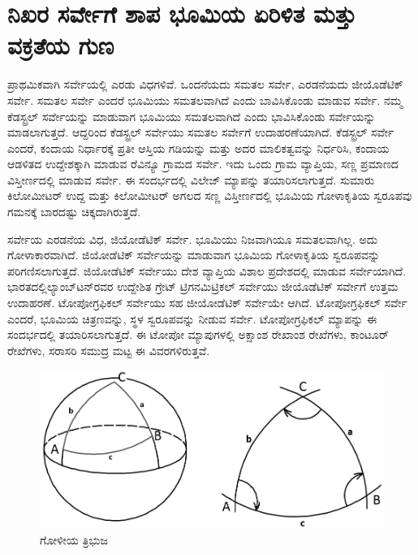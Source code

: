 
\chapter{ನಿಖರ ಸರ್ವೇಗೆ ಶಾಪ ಭೂಮಿಯ ಏರಿಳಿತ ಮತ್ತು ವಕ್ರತೆಯ ಗುಣ}

ಪ್ರಾಥಮಿಕವಾಗಿ ಸರ್ವೇಯಲ್ಲಿ ಎರಡು ವಿಧಗಳಿವೆ. ಒಂದನೆಯದು ಸಮತಲ ಸರ್ವೇ, ಎರಡನೆಯದು ಜೀಯೊಡೆಟಿಕ್​ ಸರ್ವೇ. ಸಮತಲ ಸರ್ವೇ ಎಂದರೆ ಭೂಮಿಯು ಸಮತಲವಾಗಿದೆ ಎಂದು ಬಾವಿಸಿಕೊಂಡು ಮಾಡುವ ಸರ್ವೇ. ನಮ್ಮ ಕೆಡಸ್ಟ್ರಲ್​ ಸರ್ವೇಯನ್ನು ಮಾಡುವಾಗ ಭೂಮಿಯು ಸಮತಲವಾಗಿದೆ ಎಂದು ಭಾವಿಸಿಕೊಂಡು ಸರ್ವೇಯನ್ನು ಮಾಡಲಾಗುತ್ತದೆ. ಆದ್ದರಿಂದ ಕೆಡಸ್ಟ್ರಲ್​ ಸರ್ವೇಯು ಸಮತಲ ಸರ್ವೇಗೆ ಉದಾಹರಣೆಯಾಗಿದೆ. ಕೆಡಸ್ಟ್ರಲ್​ ಸರ್ವೇ ಎಂದರೆ, ಕಂದಾಯ ನಿರ್ಧಾರಕ್ಕೆ ಪ್ರತೀ ಆಸ್ತಿಯ ಗಡಿಯನ್ನು ಮತ್ತು ಅದರ ಮಾಲಿಕತ್ವವನ್ನು ನಿರ್ಧರಿಸಿ, ಕಂದಾಯ ಆಡಳಿತದ ಉದ್ದೇಶಕ್ಕಾಗಿ ಮಾಡುವ ರೆವಿನ್ಯೂ ಗ್ರಾಮದ ಸರ್ವೇ. ಇದು ಒಂದು ಗ್ರಾಮ ವ್ಯಾಪ್ತಿಯ, ಸಣ್ಣ ಪ್ರಮಾಣದ ವಿಸ್ತೀರ್ಣದಲ್ಲಿ ಮಾಡುವ ಸರ್ವೇ. ಈ ಸಂದರ್ಭದಲ್ಲಿ ವಿಲೇಜ್​ ಮ್ಯಾಪನ್ನು ತಯಾರಿಸಲಾಗುತ್ತದೆ. ಸುಮಾರು  ಕಿಲೋಮೀಟರ್​ ಉದ್ದ ಮತ್ತು  ಕಿಲೋಮೀಟರ್​ ಅಗಲದ ಸಣ್ಣ ವಿಸ್ತೀರ್ಣದಲ್ಲಿ ಭೂಮಿಯ ಗೋಳಾಕೃತಿಯ ಸ್ವರೂಪವು ಗಮನಕ್ಕೆ ಬಾರದಷ್ಟು ಚಿಕ್ಕದಾಗಿರುತ್ತದೆ.

ಸರ್ವೇಯ ಎರಡನೆಯ ವಿಧ, ಜಿಯೋಡೆಟಿಕ್​ ಸರ್ವೇ. ಭೂಮಿಯು ನಿಜವಾಗಿಯೂ ಸಮತಲವಾಗಿಲ್ಲ. ಅದು ಗೋಳಾಕಾರವಾಗಿದೆ. ಜಿಯೋಡೆಟಿಕ್​ ಸರ್ವೇಯನ್ನು ಮಾಡುವಾಗ ಭೂಮಿಯ ಗೋಳಾಕೃತಿಯ ಸ್ವರೂಪವನ್ನು ಪರಿಗಣಿಸಲಾಗುತ್ತದೆ. ಜಿಯೋಡೆಟಿಕ್​ ಸರ್ವೇಯು ದೇಶ ವ್ಯಾಪ್ತಿಯ ವಿಶಾಲ ಪ್ರದೇಶದಲ್ಲಿ ಮಾಡುವ ಸರ್ವೇಯಾಗಿದೆ. ಭಾರತದಲ್ಲಿ\break ಲ್ಯಾಂಬ್​ಟನ್​ರವರ ಉದ್ದೇಶಿತ ಗ್ರೇಟ್​ ಟ್ರಿಗನಮಿಟ್ರಿಕಲ್​ ಸರ್ವೇಯು ಜೀಯೊಡೆಟಿಕ್​ ಸರ್ವೇಗೆ ಉತ್ತಮ ಉದಾಹರಣೆ. ಟೋಪೋಗ್ರಫಿಕಲ್​ ಸರ್ವೇಯು ಸಹ ಜೀಯೋಡೆಟಿಕ್​ ಸರ್ವೇಯೇ ಆಗಿದೆ. ಟೋಪೋಗ್ರಫಿಕಲ್​ ಸರ್ವೇ ಎಂದರೆ, ಭೂಮಿಯ ಚಿತ್ರಣವನ್ನು, ಸ್ಥಳ ಸ್ವರೂಪವನ್ನು ನೀಡುವ ಸರ್ವೇ. ಟೋಪೋಗ್ರಫಿಕಲ್​ ಮ್ಯಾಪನ್ನು ಈ ಸಂದರ್ಭದಲ್ಲಿ ತಯಾರಿಸಲಾಗುತ್ತದೆ. ಈ ಟೋಪೋ ಮ್ಯಾಪುಗಳಲ್ಲಿ ಅಕ್ಷಾಂಶ ರೇಖಾಂಶ ರೇಖೆಗಳು, ಕಾಂಟೂರ್​ ರೇಖೆಗಳು, ಸರಾಸರಿ ಸಮುದ್ರ ಮಟ್ಟ ಈ ವಿವರಗಳಿರುತ್ತವೆ.

\begin{figure}[!htbp]
\includegraphics{"images/image001.jpg"}
\caption{ಗೋಳೀಯ ತ್ರಿಭುಜ}\label{chap2-fig01}
\end{figure}

